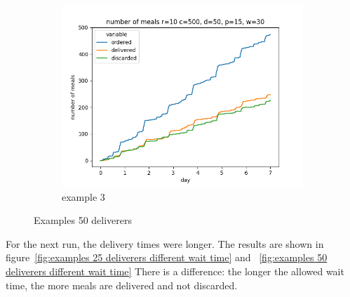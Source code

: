 \begin{center}
\begin{figure}
\begin{subfigure}[m]{0.30\textwidth}
        \end{subfigure}
        \hfill
        \begin{subfigure}[m]{0.30\textwidth}
            \centering
            \includegraphics[width=\textwidth]{sections/run2/week_nd_3_food_ordering_distribution_500_10_50_30}
            \caption{example 3}
        \end{subfigure}
        \caption{Examples 50 deliverers}
        \label{fig:examples 50 deliverers}
    \end{figure}
\end{center}

For the next run, the delivery times were longer.
The results are shown in figure~\ref{fig:examples 25 deliverers different wait time} and ~\ref{fig:examples 50 deliverers different wait time}
There is a difference: the longer the allowed wait time, the more meals are delivered and not discarded.

